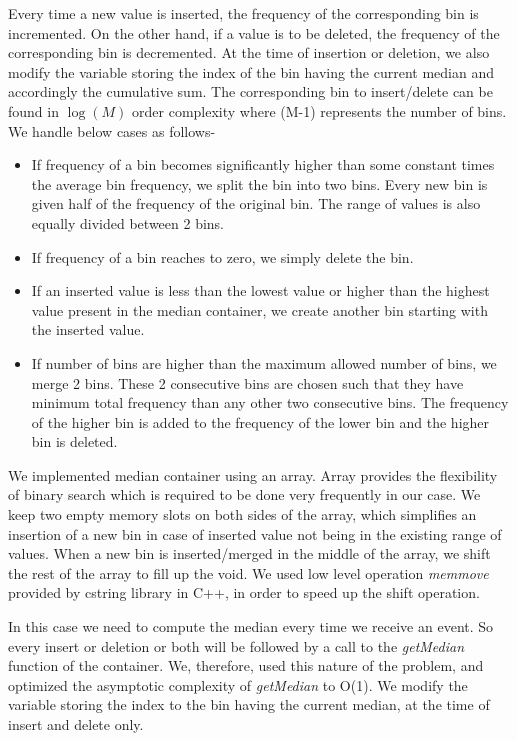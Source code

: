 Every time a new value is inserted, the frequency of the corresponding bin is incremented. On the other hand, if a value is to be deleted, the frequency of the corresponding bin is decremented. At the time of insertion or deletion, we also modify the variable storing the index of the bin having the current median and accordingly the cumulative sum. The corresponding bin to insert/delete can be found in $\log(M)$ order complexity where (M-1) represents the number of bins. We handle below cases as follows-
\begin{itemize}
\item If frequency of a bin becomes significantly higher than some constant times the average bin frequency, we split the bin into two bins. Every new bin is given half of the frequency of the original bin. The range of values is also equally divided between 2 bins.
\item If frequency of a bin reaches to zero, we simply delete the bin.
\item If an inserted value is less than the lowest value or higher than the highest value present in the median container, we create another bin starting with the inserted value.
\item If number of bins are higher than the maximum allowed number of bins, we merge 2 bins. These 2 consecutive bins are chosen such that they have minimum total frequency than any other two consecutive bins. The frequency of the higher bin is added to the frequency of the lower bin and the higher bin is deleted.
\end{itemize}

We implemented median container using an array. Array provides the flexibility of binary search which is required to be done very frequently in our case. We keep two empty memory slots on both sides of the array, which simplifies an insertion of a new bin in case of inserted value not being in the existing range of values. When a new bin is inserted/merged in the middle of the array, we shift the rest of the array to fill up the void.  We used low level operation \textit{memmove} provided by cstring library in C++, in order to speed up the shift operation.

In this case we need to compute the median every time we receive an event. So every insert or deletion or both will be followed by a call to the \textit{getMedian} function of the container. We, therefore, used this nature of the problem, and optimized the asymptotic complexity of \textit{getMedian} to O(1). We modify the variable storing the index to the bin having the current median, at the time of insert and delete only.

